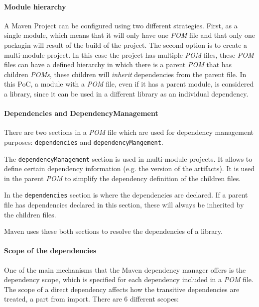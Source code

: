 \paragraph{Module hierarchy}
A Maven Project can be configured using two different strategies. First, as a single module, which means that it will only have one \textit{POM} file and that only one packagin will result of the build of the project. The second option is to create a multi-module project. In this case the project has multiple \textit{POM} files, these \textit{POM} files can have a defined hierarchy in which there is a parent \textit{POM} that has children \textit{POMs}, these children will \textit{inherit} dependencies from the parent file. In this PoC, a module with a \textit{POM} file, even if it has a parent module, is considered a library, since it can be used in a different library as an individual dependency.

\paragraph{Dependencies and DependencyManagement}
There are two sections in a \textit{POM} file which are used for dependency management purposes: \texttt{dependencies} and \texttt{dependencyMangement}.

The \texttt{dependencyManagement} section is used in multi-module projects. It allows to define certain dependency information (e.g. the version of the artifacts). It is used in the parent \textit{POM} to simplify the dependency definition of the children files.

In the \texttt{dependencies} section is where the dependencies are declared. If a parent file has dependencies declared in this section, these will always be inherited by the children files.

Maven uses these both sections to resolve the dependencies of a library.

\paragraph{Scope of the dependencies}
One of the main mechanisms that the Maven dependency manager offers is the dependency scope, which is specified for each dependency included in a \textit{POM} file. The scope of a direct dependency affects how the transitive dependencies are treated, a part from import. There are 6 different scopes:

